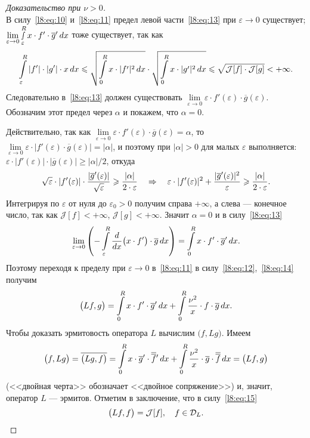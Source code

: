 \documentclass[12pt,a4paper,openany,fleqn]{book}
\newcommand{\J}{\ensuremath{\mathcal{J}}}
\newcommand{\mc}[1]{\ensuremath{\mathcal{#1}}}
\newcommand{\der}[2]{\ensuremath{\frac{d#1}{d#2}}}
\newcommand{\eps}{\varepsilon}
\theoremstyle{definition}
\begin{document}
\begin{proof}[Доказательство при $\nu>0$]
\begin{equation}
		\end{equation}
		В силу~\eqref{l8:eq:10} и~\eqref{l8:eq:11} предел левой части~\eqref{l8:eq:13} при $\eps\to0$ существует; $\lim\limits_{\eps\to0}\smallint\limits_{\eps}^R x\cdot f'\cdot\overline{g}'\,dx$ тоже существует, так как 
		\begin{equation*}
			\hfill\int\limits_{\eps}^{R}|f'|\cdot|g'|\cdot x\,dx\leqslant\sqrt{\int\limits_{0}^{R}x\cdot|f'|^2\,dx}\cdot\sqrt{\int\limits_{0}^{R}x\cdot|g'|^2\,dx}\leqslant\sqrt{\J[f]\cdot\J[g]}<+\infty.\hfill
		\end{equation*}
		Следовательно в~\eqref{l8:eq:13} должен существовать $\lim\limits_{\eps\to0}\eps\cdot f'(\eps)\cdot\overline{g}(\eps)$. Обозначим этот предел через $\alpha$ и покажем, что $\alpha=0$.
		
		Действительно, так как $\lim\limits_{\eps\to0}\eps\cdot f'(\eps)\cdot\overline{g}(\eps)=\alpha$, то $\lim\limits_{\eps\to0}\eps\cdot |f'(\eps)\cdot\overline{g}(\eps)|=|\alpha|$, и поэтому при $|\alpha|>0$ для малых $\eps$ выполняется: $\eps\cdot|f'(\eps)|\cdot|\overline{g}(\eps)|\geqslant|\alpha|/2$, откуда 
		\begin{equation*}
			\hfill\sqrt{\eps}\cdot|f'(\eps)|\cdot\frac{|\overline{g}'(\eps)|}{\sqrt{\eps}}\geqslant\frac{|\alpha|}{2\cdot\eps}\quad\Rightarrow\quad\eps\cdot|f'(\eps)|^2+\frac{|\overline{g}'(\eps)|^2}{\eps}\geqslant\frac{|\alpha|}{2\cdot\eps}.\hfill
		\end{equation*}
		Интегрируя по $\eps$ от нуля до $\eps_0>0$ получим справа $+\infty$, а слева --- конечное число, так как $\J[f]<+\infty$, $\J[g]<+\infty$. Значит $\alpha=0$ и в силу~\eqref{l8:eq:13} 
		\begin{equation}\label{l8:eq:14}
			\hfill\lim\limits_{\eps\to0}\left(-\int\limits_{\eps}^R\der{}{x}\big(x\cdot f'\big)\cdot\overline{g}\,dx\right)=\int\limits_{0}^{R}x\cdot f'\cdot\overline{g}'\,dx.\hfill
		\end{equation}
		Поэтому переходя к пределу при $\eps\to0$ в~\eqref{l8:eq:11} в силу~\eqref{l8:eq:12},~\eqref{l8:eq:14} получим
		\begin{equation}\label{l8:eq:15}
			\hfill\big(Lf,g\big)=\int\limits_0^R x\cdot f'\cdot\overline{g}'\,dx+\int\limits_{0}^{R}\frac{\nu^2}{x}\cdot f\cdot\overline{g}\,dx.\hfill
		\end{equation}
		Чтобы доказать эрмитовость оператора $L$ вычислим $\big(f,Lg\big)$. Имеем
		\begin{equation*}
			\hfill\big(f,Lg\big)=\overline{\big(Lg,f\big)}=\int\limits_0^R x\cdot \overline{g}'\cdot\overline{\overline{f}}\vphantom{f}'\,dx+\int\limits_{0}^{R}\frac{\nu^2}{x}\cdot \overline{g}\cdot\overline{\overline{f}}\,dx=\big(Lf,g\big)\hfill
		\end{equation*}
		(<<двойная черта>> обозначает <<двойное сопряжение>>) и, значит, оператор $L$ --- эрмитов. Отметим в заключение, что в силу~\eqref{l8:eq:15} 
		\begin{equation*}
			\hfill\big(Lf,f\big)=\J[f],\quad f\in\mc{D}_L.\hfill
		\end{equation*} 
	\end{proof}
	
\end{document}
